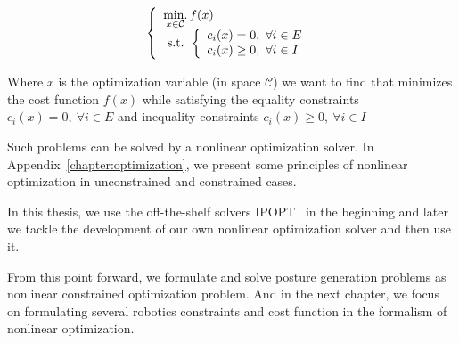 \begin{equation}
\label{eq:optim_form_PG}
  \left\{
  \begin{array}{l}
    \operatorname*{min.}\limits_{x\in\mathcal{C}}{f(x)}\\
    \text{ s.t. }
    \left\{
    \begin{array}{l}
      c_i(x) = 0,\ \forall i\in{E}\\
      c_i(x) \geq 0,\ \forall i\in{I}\\
    \end{array}
    \right.
  \end{array}
  \right.
\end{equation}

Where $x$ is the optimization variable (in space $\mathcal{C}$) we want to find that minimizes the cost function $f(x)$ while satisfying the equality constraints $c_i(x) = 0,\ \forall i\in{E}$ and inequality constraints $c_i(x) \geq 0,\ \forall i\in{I}$

Such problems can be solved by a nonlinear optimization solver.
In Appendix~\ref{chapter:optimization}, we present some principles of nonlinear optimization in unconstrained and constrained cases.

In this thesis, we use the off-the-shelf solvers IPOPT~\cite{wachter:mathprog:2006} in the beginning and later we tackle the development of our own nonlinear optimization solver and then use it.

From this point forward, we formulate and solve posture generation problems as nonlinear constrained optimization problem.
And in the next chapter, we focus on formulating several robotics constraints and cost function in the formalism of nonlinear optimization.
